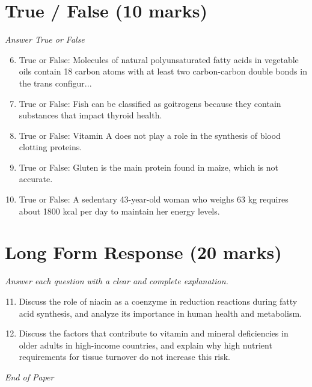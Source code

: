 \documentclass[12pt]{article}
\begin{document}
\section*{True / False (10 marks)}
\textit{Answer True or False}
\begin{enumerate}[label=\arabic*.]
\setcounter{enumi}{5}
\item True or False: Molecules of natural polyunsaturated fatty acids in vegetable oils contain 18 carbon atoms with at least two carbon-carbon double bonds in the trans configur...
\item True or False: Fish can be classified as goitrogens because they contain substances that impact thyroid health.
\item True or False: Vitamin A does not play a role in the synthesis of blood clotting proteins.
\item True or False: Gluten is the main protein found in maize, which is not accurate.
\item True or False: A sedentary 43-year-old woman who weighs 63 kg requires about 1800 kcal per day to maintain her energy levels.
\end{enumerate}

\section*{Long Form Response (20 marks)}
\textit{Answer each question with a clear and complete explanation.}
\begin{enumerate}[label=\arabic*.]
\setcounter{enumi}{10}
\item Discuss the role of niacin as a coenzyme in reduction reactions during fatty acid synthesis, and analyze its importance in human health and metabolism.
\item Discuss the factors that contribute to vitamin and mineral deficiencies in older adults in high-income countries, and explain why high nutrient requirements for tissue turnover do not increase this risk.
\end{enumerate}

\vfill
\noindent\textit{End of Paper}
\end{document}
